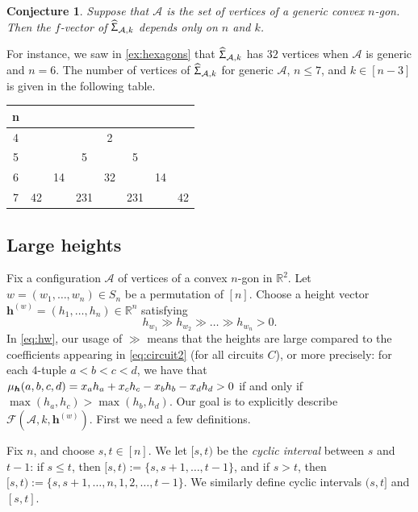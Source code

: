 \documentclass[11pt]{amsart}
\theoremstyle{plain}
\newtheorem{conjecture}[theorem]{Conjecture}
\theoremstyle{definition}
\def\R{\mathbb{R}}
\def\A{\mathcal{A}}
\def\h{{\bm{h}}}
\def\HSP{\widehat\Upsigma}
\def\Sigma{\HSP}
\begin{document}
\begin{conjecture}
Suppose that $\A$ is the set of vertices of a \emph{generic} convex $n$-gon. Then the $f$-vector of $\Sigma_{\A,k}$ depends only  on $n$ and $k$.
\end{conjecture}
\noindent For instance, we saw in \cref{ex:hexagons} that $\Sigma_{\A,k}$ has $32$ vertices when $\A$ is generic and $n=6$. The number of vertices of $\Sigma_{\A,k}$ for generic $\A$, $n\leq 7$, and $k\in[n-3]$ is given in the following table.
\begin{center}
\begin{tabular}{c|ccccccc}
n  &   &   &   &  &   &   &  \\\hline
4  &   &   &   & 2 &   &   &  \\
5  &   &   & 5 &   & 5 &   &  \\
6  &   &14 &   & 32&   &14 &  \\
7  &42 &   &231&   &231&   &42\\
\end{tabular}
\end{center}



\def\w{w}
\def\hw{\h^{(\w)}}
\def\Compatw{\mathcal{F}(\A,k,\hw)}
\def\compl#1#2{[#1,#2]^{\operatorname{c}}}
\def\TOP#1#2{\operatorname{top}^{(\w)}_{#1}(#2)}
\def\id{\operatorname{id}}
\subsection{Large heights}
Fix a configuration $\A$ of vertices of a convex $n$-gon in $\R^2$. Let $\w=(\w_1,\dots,\w_n)\in S_n$ be a permutation of $[n]$. Choose a height vector $\hw=(h_1,\dots,h_n)\in\R^n$  satisfying
\begin{equation}\label{eq:hw}
h_{\w_1} \gg h_{\w_2} \gg \dots \gg h_{\w_n}>0.
\end{equation}
In \eqref{eq:hw}, our usage of $\gg$ means that the heights are large  
compared to the coefficients appearing
in \eqref{eq:circuit2} (for all circuits $C$), or more precisely:
for each $4$-tuple
$a<b<c<d$, we have that
$\muh(a,b,c,d) = x_a h_a + x_c h_{c} - x_b h_b - x_d h_{d}>0$
 if and only if $\max(h_a, h_c) > \max(h_b, h_d)$. 
Our goal is to explicitly describe  $\Compatw$. First we need a few definitions.

Fix $n$, and choose $s,t\in[n]$. We let $[s,t)$ be the \emph{cyclic interval} between $s$ and $t-1$:
if $s\leq t$, then $[s,t) := \{s, s+1,\dots, t-1\}$, and if $s>t$, then
$[s,t) := \{s, s+1,\dots, n, 1, 2, \dots, t-1\}$. We similarly define cyclic intervals $(s,t]$ and $[s,t]$. 
\end{document}
